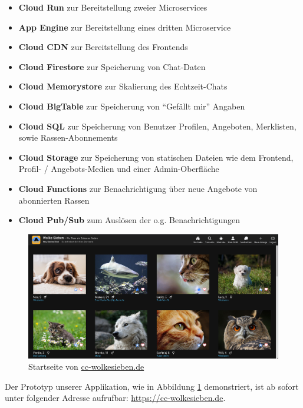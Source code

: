 \documentclass{article}
\begin{document}
\begin{itemize}
    \item \textbf{Cloud Run} zur Bereitstellung zweier Microservices
    \item \textbf{App Engine} zur Bereitstellung eines dritten Microservice
    \item \textbf{Cloud CDN} zur Bereitstellung des Frontends
    \item \textbf{Cloud Firestore} zur Speicherung von Chat-Daten
    \item \textbf{Cloud Memorystore} zur Skalierung des Echtzeit-Chats
    \item \textbf{Cloud BigTable} zur Speicherung von \enquote{Gefällt mir} Angaben
    \item \textbf{Cloud SQL} zur Speicherung von Benutzer Profilen, Angeboten, Merklisten, sowie Rassen-Abonnements
    \item \textbf{Cloud Storage} zur Speicherung von statischen Dateien wie dem Frontend, Profil- / Angebots-Medien und einer Admin-Oberfläche
    \item \textbf{Cloud Functions} zur Benachrichtigung über neue Angebote von abonnierten Rassen
    \item \textbf{Cloud Pub/Sub} zum Auslösen der o.g. Benachrichtigungen
\end{itemize}

\begin{figure}[htbp]
\centering
\label{fig:homepage}
\includegraphics[width=\textwidth]{images/homepage}
\caption{Startseite von \href{https://cc-wolkesieben.de}{cc-wolkesieben.de}}
\end{figure}

Der Prototyp unserer Applikation, wie in Abbildung \ref{fig:homepage} demonstriert, ist ab sofort unter folgender Adresse aufrufbar: \url{https://cc-wolkesieben.de}.

\end{document}
